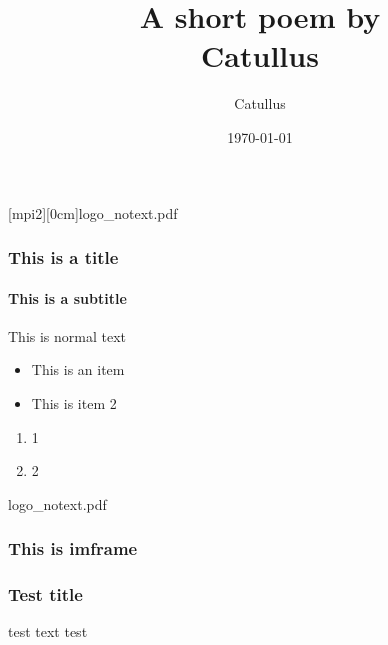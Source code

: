 \documentclass[aspectratio=169]{beamer}
\title{A short poem by \\Catullus}
\date{\today}
\author[]{Catullus}
\institute{Max Planck Institute for \\Intelligent Systems}
\begin{document}
[mpi2][0cm]{logo_notext.pdf}
\begin{frame}
\titlepage
\end{frame}
\begin{frame}
  \frametitle{This is a title}
  \framesubtitle{This is a subtitle}
This is normal text
\begin{itemize}
\item This is an item
\item This is item 2
\end{itemize}
\begin{enumerate}
\item 1
\item 2
\end{enumerate}
\end{frame}

\begin{imframe}{logo_notext.pdf}
  \frametitle{This is imframe}
\end{imframe}

\begin{solidframe}
  \frametitle{Test title}
  test text
  \alert{test}
\end{solidframe}
\end{document}
